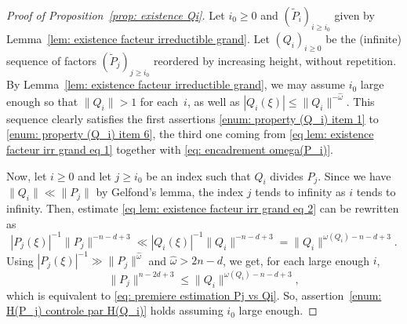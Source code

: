 \documentclass[10pt,a4paper]{amsart}
\numberwithin{equation}{section}
\newcommand\tP{\widetilde{P}}
\newcommand\homega{\widehat{\omega}}\newcommand\HH{\mathcal{H}}
\newcommand{\normH}[1]{\|#1\|}
\theoremstyle{definition}
\theoremstyle{plain}
\begin{document}
\begin{proof}[Proof of Proposition~\ref{prop: existence Qi}]
Let $i_0\geq 0$ and $(\tP_i)_{i\geq i_0}$ given by Lemma~\ref{lem: existence facteur irreductible grand}. Let $(Q_i)_{i\geq 0}$ be the (infinite) sequence of factors $(\tP_j)_{j\geq i_0}$ reordered by increasing height, without repetition. By Lemma~\ref{lem: existence facteur irreductible grand}, we may assume $i_0$ large enough so that $\normH{Q_i} > 1$ for each~$i$, as well as $|Q_i(\xi)| \leq \normH{Q_i}^{-\homega}$. This sequence clearly satisfies the first assertions \eqref{enum: property (Q_i) item 1} to \eqref{enum: property (Q_i) item 6}, the third one coming from \eqref{eq lem: existence facteur irr grand eq 1} together with \eqref{eq: encadrement omega(P_i)}.

Now, let $i\geq 0$ and let $j\geq i_0$ be an index such that $Q_i$ divides $P_j$. Since we have $\normH{Q_i}\ll \normH{P_j}$ by Gelfond's lemma, the index $j$ tends to infinity as $i$ tends to infinity. Then, estimate \eqref{eq lem: existence facteur irr grand eq 2} can be rewritten as
\begin{equation}
\label{eq proof: inter 1 pour controler H(P_j)}
|P_j(\xi)|^{-1}\normH{P_j}^{-n-d+3} \ll |Q_i(\xi)|^{-1}\normH{Q_i}^{-n-d+3} = \normH{Q_i}^{\omega(Q_i)-n-d+3}.
\end{equation}
Using $|P_j(\xi)|^{-1} \gg \normH{P_j}^{\homega}$ and $\homega > 2n-d$, we get, for each large enough $i$,
\begin{equation*}
\normH{P_j}^{n-2d+3} \leq \normH{Q_i}^{\omega(Q_i)-n-d+3},
\end{equation*}
which is equivalent to \eqref{eq: premiere estimation Pj vs Qi}. So, assertion~\eqref{enum: H(P_j) controle par H(Q_i)} holds assuming $i_0$ large enough.


\end{proof}
\end{document}
